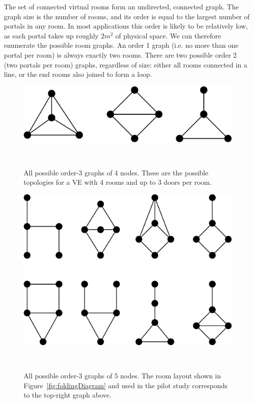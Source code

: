 \documentclass{sigchi}
\begin{document}
The set of connected virtual rooms form an undirected, connected graph.  The graph size is the number of rooms, and its order is equal to the largest number of portals in any room.  In most applications this order is likely to be relatively low, as each portal takes up roughly $2 m^2$ of physical space.  We can therefore enumerate the possible room graphs.  An order 1 graph (i.e. no more than one portal per room) is always exactly two rooms.  There are two possible order 2 (two portals per room) graphs, regardless of size: either all rooms connected in a line, or the end rooms also joined to form a loop.

\begin{figure}[htb]
  \centering
  \includegraphics[width=1\columnwidth]{figures/Size4Graphs.pdf}
  \caption{All possible order-3 graphs of 4 nodes.  These are the possible topologies for a VE with 4 rooms and up to 3 doors per room.}~\label{fig:size4Graphs}
\end{figure}

\begin{figure}[htb]
  \centering
  \includegraphics[width=1\columnwidth]{figures/Size5Graphs.pdf}
  \caption{All possible order-3 graphs of 5 nodes.  The room layout shown in Figure~\ref{fig:foldingDiagram} and used in the pilot study corresponds to the top-right graph above.}~\label{fig:size5Graphs}
\end{figure}
\end{document}
